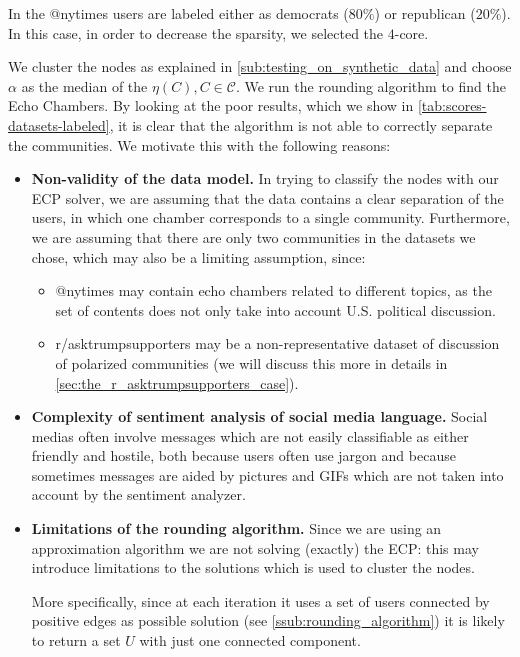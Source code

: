 In the @nytimes users are labeled either as democrats ($80\%$) or republican
($20\%$). In this case, in order to decrease the sparsity, we selected the
$4$-core.


We cluster the nodes as explained in \autoref{sub:testing_on_synthetic_data}
and choose $\alpha $ as the median of the $\eta(C), C \in \mathcal{C} $. We run
the rounding algorithm to find the Echo Chambers. By
looking at the poor results, which we show in
\autoref{tab:scores-datasets-labeled}, it is clear that the algorithm is not
able to correctly separate the communities. We motivate this with the following
reasons:
\begin{itemize}
	\item \textbf{Non-validity of the data model.} In trying to classify the
	      nodes with our \acrshort{ECP} solver, we are assuming that the data
	      contains a clear separation of the users, in which one chamber
	      corresponds to a single community. Furthermore, we are assuming that
	      there are only two communities in the datasets we chose, which may also
	      be a limiting assumption, since:
	      \begin{itemize}
		      \item @nytimes may contain echo chambers related to different
		            topics, as the set of contents does not only take into account
		            U.S. political discussion.
		      \item r/asktrumpsupporters may be a non-representative
		            dataset of discussion of polarized communities (we will
		            discuss this more in details in
		            \autoref{sec:the_r_asktrumpsupporters_case}).
	      \end{itemize}
	\item \textbf{Complexity of sentiment analysis of social media language.}
	      Social medias often involve messages which are not easily classifiable
	      as either friendly and hostile, both because users often use jargon
	      and because sometimes messages are aided by pictures and GIFs which
	      are not taken into account by the sentiment analyzer.
	\item \textbf{Limitations of the rounding algorithm.} Since we are
	      using an approximation algorithm we are not solving (exactly) the
	      \acrshort{ECP}: this may introduce limitations to the solutions which
	      is used to cluster the nodes.

	      More specifically, since at each iteration it uses a set of users
	      connected by positive edges as possible solution (see
	      \autoref{ssub:rounding_algorithm}) it is likely to return
	      a set $U$ with just one connected component.

\end{itemize}

